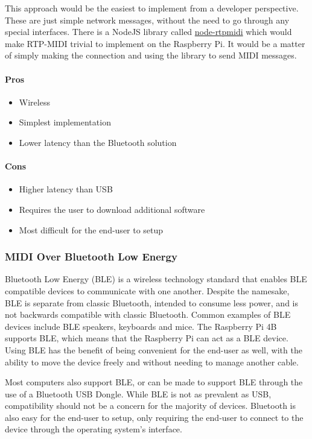 This approach would be the easiest to implement from a developer perspective. These are
just simple network messages, without the need to go through any special interfaces. There
is a NodeJS library called \url{node-rtpmidi} which would make RTP-MIDI trivial to
implement on the Raspberry Pi. It would be a matter of simply making the connection and
using the library to send MIDI messages.

\paragraph{Pros}

\begin{itemize}
  \item Wireless
  \item Simplest implementation
  \item Lower latency than the Bluetooth solution
\end{itemize}

\paragraph{Cons}

\begin{itemize}
  \item Higher latency than USB
  \item Requires the user to download additional software
  \item Most difficult for the end-user to setup
\end{itemize}

\subsubsection{MIDI Over Bluetooth Low Energy}
\label{sec:ble_midi}

Bluetooth Low Energy (BLE) is a wireless technology standard that enables BLE compatible
devices to communicate with one another. Despite the namesake, BLE is separate from
classic Bluetooth, intended to consume less power, and is not backwards compatible with
classic Bluetooth. Common examples of BLE devices include BLE speakers, keyboards and
mice. The Raspberry Pi 4B supports BLE, which means that the Raspberry Pi can act as a BLE
device. Using BLE has the benefit of being convenient for the end-user as well, with the
ability to move the device freely and without needing to manage another cable.

Most computers also support BLE, or can be made to support BLE through the use of a
Bluetooth USB Dongle. While BLE is not as prevalent as USB, compatibility should not be a
concern for the majority of devices. Bluetooth is also easy for the end-user to setup,
only requiring the end-user to connect to the device through the operating system's
interface.


